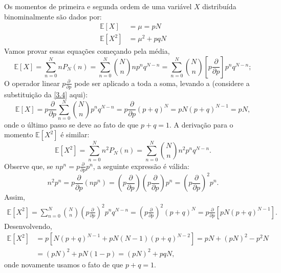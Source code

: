 Os momentos de primeira e segunda ordem de uma variável $X$ distribuída binominalmente são dados por:
\begin{subequations}\label{3.6}
\begin{align}
\mathbb{E}[X] &= \mu = pN \\
\mathbb{E}[X^2] &= \mu^2 + pqN 
\end{align}
\end{subequations}
Vamos provar essas equações começando pela média,
\begin{equation*}
\mathbb{E}[X] = \sum_{n=0}^{N} n P_N(n) = \sum_{n=0}^{N} \binom{N}{n} n p^n q^{N-n} = \sum_{n=0}^{N}  \binom{N}{n} \left[p \dfrac{\partial}{\partial p}\right]p^n q^{N-n};
\end{equation*}
O operador linear $p\frac{\partial}{\partial p}$ pode ser aplicado a toda a soma, levando a (considere a substituição da \autoref{3.4} aqui):
\begin{equation*}
\mathbb{E}[X] = p \dfrac{\partial}{\partial p} \sum_{n=0}^{N} \binom{N}{n} p^n q^{N-n} = p \dfrac{\partial}{\partial p} (p + q)^N = pN(p + q)^{N-1} = pN,
\end{equation*}
onde o último passo se deve ao fato de que $p + q = 1$. A derivação para o momento $\mathbb{E}[X^2]$ é similar:
\begin{equation*}
\mathbb{E}[X^2] = \sum_{n=0}^{N} n^2 P_N(n) = \sum_{n=0}^{N} \binom{N}{n} n^2p^n q^{N-n}.
\end{equation*}
Observe que, se $np^n = p\frac{\partial}{\partial p}p^n$, a seguinte expressão é válida:
\begin{equation*}
n^2p^n = p\frac{\partial}{\partial p} \left(np^n\right) = \left(p\frac{\partial}{\partial p}\right)\left(p\frac{\partial}{\partial p}\right)p^n = \left(p\frac{\partial}{\partial p}\right)^2p^n.
\end{equation*}
Assim, 
\begin{align*}
\mathbb{E}[X^2] = \sum_{n=0}^{N} \binom{N}{n} \left(p\frac{\partial}{\partial p}\right)^2 p^nq^{N-n} =  \left(p\frac{\partial}{\partial p}\right)^2 (p + q)^N = p\frac{\partial}{\partial p} \left[pN (p + q)^{N -1}\right].
\end{align*}
Desenvolvendo, 
\begin{align*}
\mathbb{E}[X^2] &= p\left[N(p + q)^{N -1} + pN(N - 1)(p + q)^{N - 2}\right] = pN + (pN)^2 - p^2N \\
&= (pN)^2 + pN(1 - p) = (pN)^2 + pqN,
\end{align*}
onde novamente usamos o fato de que $p + q = 1$. 

